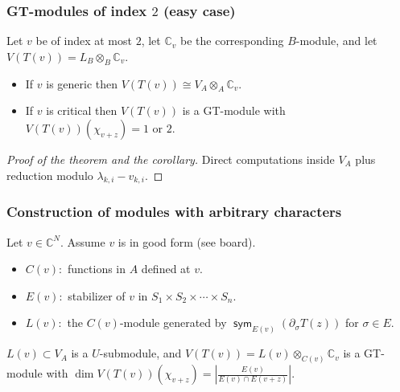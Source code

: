 \documentclass[smaller,usepdftitle=false]{beamer}
\newcommand\CC{\mathbb C}
\newcommand\ot{\otimes}
\DeclareMathOperator\sym{\mathsf{sym}}
\begin{document}
\begin{frame}
\frametitle{GT-modules of index $2$ (easy case)}
\begin{Corollary}
Let $v$ be of index at most $2$, let $\CC_v$ be the 
corresponding $B$-module, and let $V(T(v)) = L_B \ot_B \CC_v$.
\begin{itemize}
\item If $v$ is generic then $V(T(v)) \cong V_A \ot_A \CC_v$.

\item If $v$ is critical then $V(T(v))$ is a GT-module with 
$V(T(v))(\chi_{v+z}) = 1$ or $2$. 
\end{itemize}
\end{Corollary}

\begin{proof}[Proof of the theorem and the corollary]
Direct computations inside $V_A$ plus reduction modulo $\lambda_{k,i} - 
v_{k,i}$.
\end{proof}

\end{frame}

\begin{frame}
\frametitle{Construction of modules with arbitrary characters}
Let $v \in \CC^N$. Assume $v$ is in good form (see board).

\begin{itemize}
\item $C(v):$ functions in $A$ defined at $v$.

\item $E(v):$ stabilizer of $v$ in $S_1 \times S_2 \times \cdots \times S_n$.

\item $L(v):$ the $C(v)$-module generated by $\sym_{E(v)} (\partial_\sigma 
T(z))$ for $\sigma \in E$.
\end{itemize}
\pause

\begin{Theorem}[Ramírez, Z' - '17]
$L(v) \subset V_A$ is a $U$-submodule, and $V(T(v)) = L(v) \ot_{C(v)} \CC_v$ 
is a GT-module with $\dim V(T(v))(\chi_{v+z}) = |\frac{E(v)}{E(v) \cap 
E(v+z)}|$.
\end{Theorem}
\end{frame}
\end{document}
